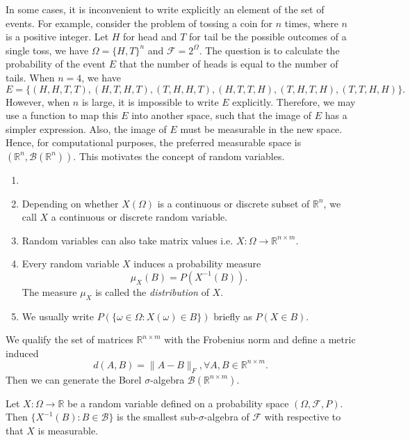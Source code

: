 In some cases, it is inconvenient to write explicitly an element of the set of events. For example, consider the problem of tossing a coin for $n$ times, where $n$ is a positive integer. Let $H$ for head and $T$ for tail be the possible outcomes of a single toss, we have $\Omega=\{H,T\}^n$ and $\mathcal{F}=2^\Omega$. The question is to calculate the probability of the event $E$ that the number of heads is equal to the number of tails. When $n=4$, we have
$$E=\{(H,H,T,T),(H,T,H,T),(T,H,H,T),(H,T,T,H),(T,H,T,H),(T,T,H,H)\}.$$
However, when $n$ is large, it is impossible to write $E$ explicitly. Therefore, we may use a function to map this $E$ into another space, such that the image of $E$ has a simpler expression. Also, the image of $E$ must be measurable in the new space. Hence, for computational purposes, the preferred measurable space is $(\mathbb{R}^n,\mathcal{B}(\mathbb{R}^n))$. This motivates the concept of random variables.

\begin{remark}
  \begin{enumerate}
    \item []
    \item Depending on whether $X(\Omega)$ is a continuous or discrete subset of $\mathbb{R}^n$, we call $X$ a continuous or discrete random variable.
    \item Random variables can also take matrix values i.e. $X:\Omega\to\mathbb{R}^{n\times m}$.
    \item Every random variable $X$ induces a probability measure
          \begin{equation}
            \mu_X(B) = P(X^{-1}(B)).
          \end{equation} The measure $\mu_X$ is called the \textit{distribution} of $X$.
    \item We usually write $P(\{\omega\in\Omega : X(\omega)\in B\})$ briefly as $P(X\in B)$.
  \end{enumerate}
\end{remark}

\begin{remark}
  We qualify the set of matrices $\mathbb{R}^{n\times m}$ with the Frobenius norm and define a metric induced
  $$d(A,B)=\|A-B\|_F,\forall A,B\in \mathbb{R}^{n\times m}.$$
  Then we can generate the Borel $\sigma$-algebra $\mathcal{B}(\mathbb{R}^{n\times m})$.
\end{remark}

\begin{theorem}
  Let $X:\Omega\to\mathbb{R}$ be a random variable defined on a probability space $(\Omega, \mathcal{F}, P)$. Then $\{X^{-1}(B) : B\in \mathcal{B}\}$ is the smallest sub-$\sigma$-algebra of $\mathcal{F}$ with respective to that $X$ is measurable.
\end{theorem}

